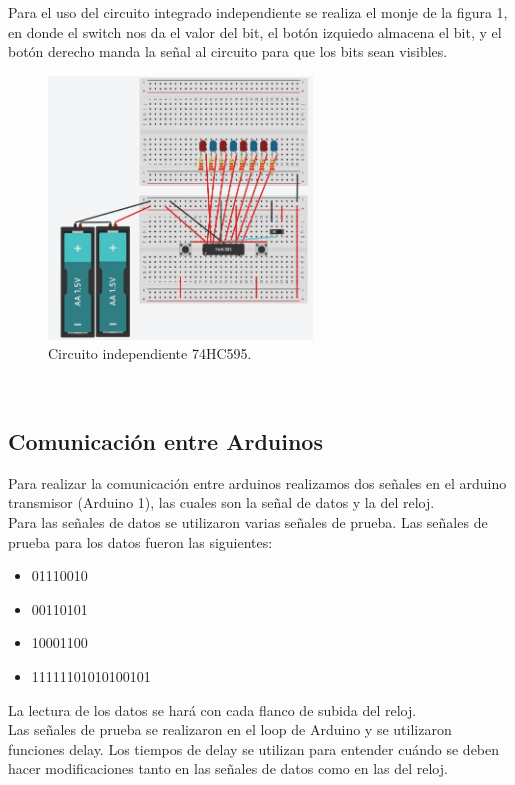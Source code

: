 \documentclass{article}
\begin{document}
Para el uso del circuito integrado independiente se realiza el monje de la figura 1, en donde el switch nos da el valor del bit, el botón izquiedo almacena el bit, y el botón derecho manda la señal al circuito para que los bits sean visibles.

\newpage

\begin{figure}[h]
\includegraphics[width=7cm]{74HC595.jpg}
\centering
\caption{Circuito independiente 74HC595.}
\label{fig:74HC595.jpg}
\end{figure}
\cite{punto1}\\


\subsection{Comunicación entre Arduinos}
Para realizar la comunicación entre arduinos realizamos dos señales en el arduino transmisor (Arduino 1), las cuales son la señal de datos y la del reloj. \\

Para las señales de datos se utilizaron varias señales de prueba. Las señales de prueba para los datos fueron las siguientes:
\begin{itemize}
\item 01110010
\item 00110101
\item 10001100
\item 11111101010100101
\end{itemize}

La lectura de los datos se hará con cada flanco de subida del reloj.\\

Las señales de prueba se realizaron en el loop de Arduino y se utilizaron funciones delay. Los tiempos de delay se utilizan para entender cuándo se deben hacer modificaciones tanto en las señales de datos como en las del reloj.\\
\end{document}
